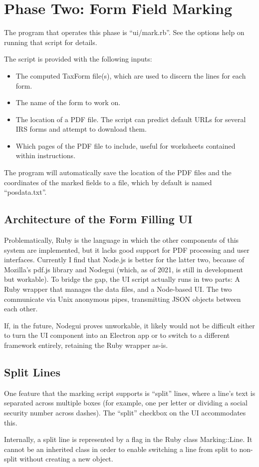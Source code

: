 \section{Phase Two: Form Field Marking}

The program that operates this phase is ``ui/mark.rb''. See the options help on
running that script for details.

The script is provided with the following inputs:
\begin{itemize}
\item The computed TaxForm file(s), which are used to discern the lines for each
form.
\item The name of the form to work on.
\item The location of a PDF file. The script can predict default URLs for
several IRS forms and attempt to download them.
\item Which pages of the PDF file to include, useful for worksheets contained
within instructions.
\end{itemize}
The program will automatically save the location of the PDF files and the
coordinates of the marked fields to a file, which by default is named
``posdata.txt''.


\subsection{Architecture of the Form Filling UI}

Problematically, Ruby is the language in which the other components of this
system are implemented, but it lacks good support for PDF processing and user
interfaces. Currently I find that Node.js is better for the latter two, because
of Mozilla's pdf.js library and Nodegui (which, as of 2021, is still in
development but workable). To bridge the gap, the UI script actually runs in two
parts: A Ruby wrapper that manages the data files, and a Node-based UI. The two
communicate via Unix anonymous pipes, transmitting JSON objects between each
other.

If, in the future, Nodegui proves unworkable, it likely would not be difficult
either to turn the UI component into an Electron app or to switch to a different
framework entirely, retaining the Ruby wrapper as-is.


\subsection{Split Lines}

One feature that the marking script supports is ``split'' lines, where a line's
text is separated across multiple boxes (for example, one per letter or dividing
a social security number across dashes). The ``split'' checkbox on the UI
accommodates this.

Internally, a split line is represented by a flag in the Ruby class
Marking::Line. It cannot be an inherited class in order to enable switching
a line from split to non-split without creating a new object.




